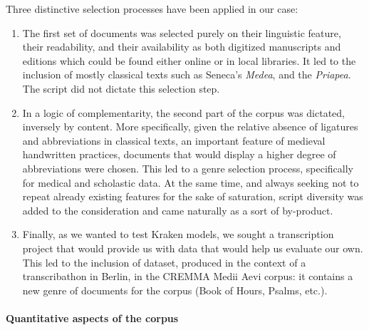\documentclass{article}
\begin{document}
Three distinctive selection processes have been applied in our case:
\begin{enumerate}
    \item The first set of documents was selected purely on their linguistic feature, their readability, and their availability as both digitized manuscripts and editions which could be found either online or in local libraries. It led to the inclusion of mostly classical texts such as Seneca's \textit{Medea}, and the \textit{Priapea}. The script did not dictate this selection step.
    \item In a logic of complementarity, the second part of the corpus was dictated, inversely by content. More specifically, given the relative absence of ligatures and abbreviations in classical texts, an important feature of medieval handwritten practices, documents that would display a higher degree of abbreviations were chosen. This led to a genre selection process, specifically for medical and scholastic data. At the same time, and always seeking not to repeat already existing features for the sake of saturation, script diversity was added to the consideration and came naturally as a sort of by-product. 
    \item Finally, as we wanted to test Kraken models, we sought a transcription project that would provide us with data that would help us evaluate our own. This led to the inclusion of \cite{eichenberger_nicole_2021_5582483} dataset, produced in the context of a transcribathon in Berlin, in the CREMMA Medii Aevi corpus: it contains a new genre of documents for the corpus (Book of Hours, Psalms, etc.).
\end{enumerate}



\paragraph{Quantitative aspects of the corpus}
\end{document}
